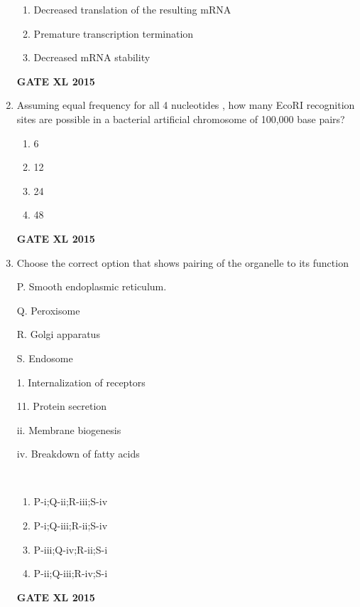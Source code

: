 \documentclass[journal,12pt,onecolumn]{IEEEtran}
\begin{document}
\begin{enumerate}
\begin{enumerate}
	    \item Decreased translation of the resulting mRNA
	    \item Premature transcription termination
            \item  Decreased mRNA stability
    \end{enumerate}
\begin{flushright}\textbf{GATE XL 2015}\end{flushright}
\item Assuming equal frequency for all 4 nucleotides , how many EcoRI recognition sites  are possible in a bacterial artificial chromosome of 100,000 base pairs?
    \begin{enumerate}
            \item 6
	    \item 12
	    \item 24
            \item 48
    \end{enumerate}
\begin{flushright}\textbf{GATE XL 2015}\end{flushright}
\item  Choose the correct option that shows pairing of the organelle to its function\\
	\begin{minipage}{0.5\textwidth}\begin{flushleft}
P. Smooth endoplasmic reticulum.

Q. Peroxisome

R. Golgi apparatus

S. Endosome
	\end{flushleft}
	\end{minipage}
	\begin{minipage}{0.5\textwidth}\begin{flushleft}
1. Internalization of receptors

11. Protein secretion

ii. Membrane biogenesis 

iv. Breakdown of fatty acids
	\end{flushleft}
	\end{minipage}\\
    \begin{enumerate}
            \item P-i;Q-ii;R-iii;S-iv
            \item P-i;Q-iii;R-ii;S-iv
            \item P-iii;Q-iv;R-ii;S-i
            \item P-ii;Q-iii;R-iv;S-i
    \end{enumerate}
\begin{flushright}\textbf{GATE XL 2015}\end{flushright}


\end{enumerate}
\end{document}
